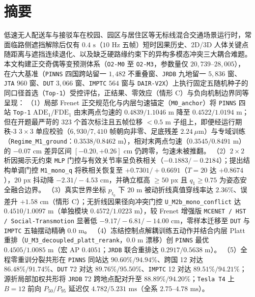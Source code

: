 \documentclass[UTF8,a4paper,12pt,openany,oneside]{ctexrep}
\begin{document}
\chapter*{摘\quad 要}
低速无人配送车与接驳车在校园、园区与居住区等无标线混合交通场景运行时，常面临路侧遮挡解除后仅有 $0.4\text{ s}$（$10\text{ Hz}$ 五帧）短时因果历史、2D/3D 人体关键点随距离与遮挡连续退化、以及缺乏硬路缘约束下的异构多模态冲突三大耦合难题。本文构建正交奇偶等变预测体系（\texttt{O2-M0} 至 \texttt{O2-M3}，参数量仅 $20{,}739\text{--}28{,}005$），在六大基准（\texttt{PINNS} 四国跨站留一 $1{,}482$ 不重叠窗、\texttt{JRDB} 九地留一 $5{,}836$ 窗、\texttt{JTA} $960$ 窗、\texttt{DUT} $3{,}066$ 窗、\texttt{IMPTC} $564$ 窗与 \texttt{DAIR-V2X}）上执行固定五随机种子的同口径首选（\texttt{Top-1}）受控评估，正结果、零效应（情形 C）与负向机制边界同等呈现：
（1）局部 Frenet 正交规范化与内层匀速锚定（\texttt{M0\_anchor}）将 \texttt{PINNS} 四站 \texttt{Top-1} $\text{ADE}_1/\text{FDE}_1$ 由末两点匀速的 $0.4839 / 1.1046\text{ m}$ 降至 $0.4522 / 1.0194\text{ m}$；但在开题最严苛的 $323$ 个首次标注且五帧位移 $<0.5\text{ m}$ 子组上，即便经运行期秩-3 $3\times 3$ 单应校验（$6{,}930 / 7{,}410$ 帧朝向非零、足底残差 $2.24\ \mu\text{m}$）与专域训练（\texttt{Regime\_M1\_ground}：$0.3538 / 0.8462\text{ m}$），相对末两点匀速（$0.3545 / 0.8491\text{ m}$）的 $-0.07\text{ cm}$ 差异区间 $[-0.20, +0.26]\text{ cm}$ 仍跨零，匀速未被推翻。
（2）$2\times 2$ 析因揭示无约束 \texttt{MLP} 门控与有效关节率呈负秩相关（$-0.1883 / -0.2184$）；提出结构单调门控 \texttt{M1\_mono\_q} 将秩相关恢复至 $+0.7301 / +0.6691$（$T=20$ 达 $+0.8674$），$20\text{ px}$ 抖动降 $-2.31 / -4.53\text{ cm}$，并确立框高 $\ge 50\text{ px}$ 且 $q_1 \ge 0.75$ 为姿态安全融合边界。
（3）真实世界坐标 $p_{t_0}$ 下 $20\text{ m}$ 被动折线真值穿线率达 $2.36\%$、误差升 $+1.58\text{ cm}$（情形 C）；无折线因果径向冲突门控 \texttt{U\_M2b\_mono\_conflict} 达 $0.4510 / 1.0097\text{ m}$（单独模块 $0.4572 / 1.0223\text{ m}$），较 Frenet 增强版 \texttt{MCENET / HST / Social-Transmotion} 显著低 $-9.17 / -6.81 / -14.00\text{ cm}$，零样本迁移至 \texttt{DUT} 与 \texttt{IMPTC} 五轴摆动精确 $0.0\text{ m}$。
（4）冻结控制点解耦训练五动作并结合内层 Platt 重排（\texttt{U\_M3\_decoupled\_platt\_rerank}，$0.0\text{ m}$ 漂移）创 \texttt{PINNS} 最优 $0.4505 / 1.0085\text{ m}$（宏 AP $0.4051$；\texttt{JRDB} 联合重排达 $0.2917 / 0.5638\text{ m}$）。
（5）全程零重训分裂共形在 \texttt{PINNS} 同站达 $90.60\% / 94.94\%$、跨国 12 对达 $86.48\% / 91.74\%$、\texttt{DUT} 72 对达 $89.76\% / 95.50\%$、\texttt{IMPTC} 12 对达 $89.51\% / 94.21\%$；源折局部加权共形将 \texttt{JRDB} 72 跨地点配对升至 $88.89\% / 94.20\%$；\texttt{Tesla T4} 上 $B=12$ 前向 $P_{50}/P_{95}$ 延迟仅 $4.782 / 5.231\text{ ms}$（全系 $2.75\text{--}4.78\text{ ms}$）。
\end{document}
